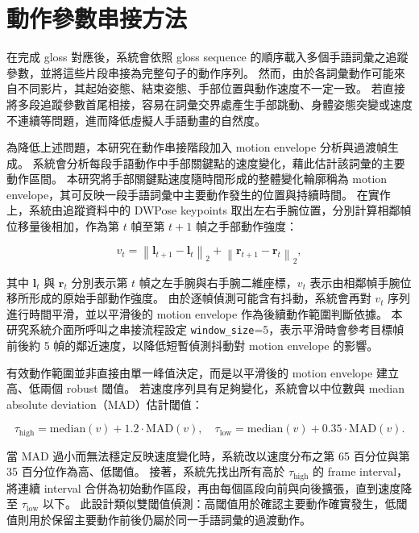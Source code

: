 \documentclass[class=NCU_thesis, crop=false]{standalone}
\begin{document}
\section{動作參數串接方法}
\label{sec:motion_concatenation}

在完成 gloss 對應後，系統會依照 gloss sequence 的順序載入多個手語詞彙之追蹤參數，並將這些片段串接為完整句子的動作序列。
然而，由於各詞彙動作可能來自不同影片，其起始姿態、結束姿態、手部位置與動作速度不一定一致。
若直接將多段追蹤參數首尾相接，容易在詞彙交界處產生手部跳動、身體姿態突變或速度不連續等問題，進而降低虛擬人手語動畫的自然度。

為降低上述問題，本研究在動作串接階段加入 motion envelope 分析與過渡幀生成。
系統會分析每段手語動作中手部關鍵點的速度變化，藉此估計該詞彙的主要動作區間。
本研究將手部關鍵點速度隨時間形成的整體變化輪廓稱為 motion envelope，其可反映一段手語詞彙中主要動作發生的位置與持續時間。
在實作上，系統由追蹤資料中的 DWPose keypoints 取出左右手腕位置，分別計算相鄰幀位移量後相加，作為第 $t$ 幀至第 $t+1$ 幀之手部動作強度：

\begin{equation}
    v_t =
    \left\| \mathbf{l}_{t+1} - \mathbf{l}_{t} \right\|_2
    +
    \left\| \mathbf{r}_{t+1} - \mathbf{r}_{t} \right\|_2 ,
    \label{eq:motion_envelope}
\end{equation}

其中 $\mathbf{l}_t$ 與 $\mathbf{r}_t$ 分別表示第 $t$ 幀之左手腕與右手腕二維座標，$v_t$ 表示由相鄰幀手腕位移所形成的原始手部動作強度。
由於逐幀偵測可能含有抖動，系統會再對 $v_t$ 序列進行時間平滑，並以平滑後的 motion envelope 作為後續動作範圍判斷依據。
本研究系統介面所呼叫之串接流程設定 \texttt{window\_size}=5，表示平滑時會參考目標幀前後約 5 幀的鄰近速度，以降低短暫偵測抖動對 motion envelope 的影響。

有效動作範圍並非直接由單一峰值決定，而是以平滑後的 motion envelope 建立高、低兩個 robust 閾值。
若速度序列具有足夠變化，系統會以中位數與 median absolute deviation（MAD）估計閾值：

\begin{equation}
    \tau_{\mathrm{high}} = \mathrm{median}(v) + 1.2 \cdot \mathrm{MAD}(v),
    \quad
    \tau_{\mathrm{low}} = \mathrm{median}(v) + 0.35 \cdot \mathrm{MAD}(v).
    \label{eq:motion_envelope_threshold}
\end{equation}

當 MAD 過小而無法穩定反映速度變化時，系統改以速度分布之第 65 百分位與第 35 百分位作為高、低閾值。
接著，系統先找出所有高於 $\tau_{\mathrm{high}}$ 的 frame interval，將連續 interval 合併為初始動作區段，再由每個區段向前與向後擴張，直到速度降至 $\tau_{\mathrm{low}}$ 以下。
此設計類似雙閾值偵測：高閾值用於確認主要動作確實發生，低閾值則用於保留主要動作前後仍屬於同一手語詞彙的過渡動作。
\end{document}
